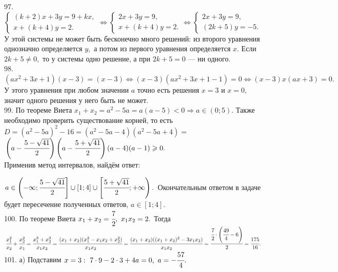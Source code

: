 \documentclass[12pt]{article}
\begin{document}
97. $\begin{cases}
(k+2)x+3y=9+kx,\\
x+(k+4)y=2.
\end{cases}\Leftrightarrow\begin{cases}
2x+3y=9,\\
x+(k+4)y=2.
\end{cases}\Leftrightarrow\begin{cases}
2x+3y=9,\\
(2k+5)y=-5.
\end{cases}$
У этой системы не может быть бесконечно много решений: из второго уравнения однозначно определяется $y,$ а потом из первого уравнения определяется $x.$ Если $2k+5\neq0,$ то у системы одно решение, а при $2k+5=0$ --- ни одного.\\
98. $(ax^2+3x+1)(x-3)=(x-3)\Leftrightarrow (x-3)(ax^2+3x+1-1)=0\Leftrightarrow (x-3)x(ax+3)=0.$ У этого уравнения при любом значении $a$ точно есть решения $x=3$ и $x=0,$ значит одного решения у него быть не может.\\
99. По теореме Виета $x_1+x_2=a^2-5a=a(a-5)<0\Rightarrow a\in(0;5).$ Также необходимо проверить существование корней, то есть $D=(a^2-5a)^2-16=
(a^2-5a-4)(a^2-5a+4)=$\\$\left(a-\cfrac{5-\sqrt{41}}{2}\right)\left(a-\cfrac{5+\sqrt{41}}{2}\right)(a-4)(a-1)\geqslant0.$\\ Применив метод интервалов, найдём ответ:
\begin{figure}[ht!]
\end{figure}
$a\in\left(-\infty;\cfrac{5-\sqrt{41}}{2}\right]\cup[1;4]\cup\left[\cfrac{5+\sqrt{41}}{2};+\infty\right).$
Окончательным ответом в задаче будет пересечение полученных ответов, $a\in [1;4].$\\
100. По теореме Виета $x_1+x_2=\cfrac{7}{2},\ x_1x_2=2.$ Тогда $\cfrac{x_1^2}{x_2}+\cfrac{x_2^2}{x_1}=\cfrac{x_1^3+x_2^3}{x_1x_2}=\cfrac{(x_1+x_2)(x_1^2-x_1x_2+x_2^2)}{x_1x_2}=
\cfrac{(x_1+x_2)((x_1+x_2)^2-3x_1x_2)}{x_1x_2}=\cfrac{\cfrac{7}{2}\cdot\left(\cfrac{49}{4}-6\right)}{2}=\cfrac{175}{16}.$\\
101. а) Подставим $x=3:\ 7\cdot9-2\cdot3+4a=0,\ a=-\cfrac{57}{4}.$\\
\end{document}
